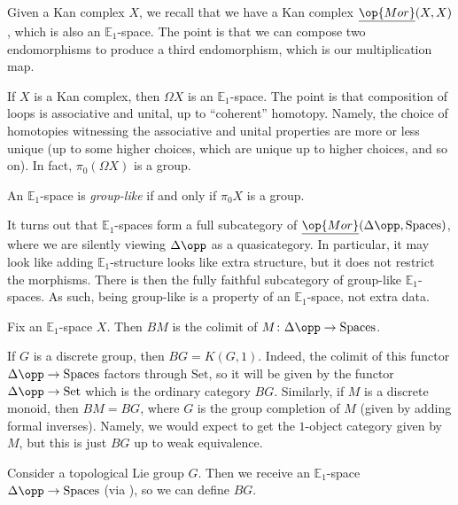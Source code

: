 \documentclass[../notes.tex]{subfiles}
\begin{document}
\begin{example}
	Given a Kan complex $X$, we recall that we have a Kan complex $\underline{\op{Mor}}(X,X)$, which is also an $\mathbb E_1$-space. The point is that we can compose two endomorphisms to produce a third endomorphism, which is our multiplication map.
\end{example}
\begin{example}
	If $X$ is a Kan complex, then $\Omega X$ is an $\mathbb E_1$-space. The point is that composition of loops is associative and unital, up to ``coherent'' homotopy. Namely, the choice of homotopies witnessing the associative and unital properties are more or less unique (up to some higher choices, which are unique up to higher choices, and so on). In fact, $\pi_0(\Omega X)$ is a group.
\end{example}
\begin{definition}
	An $\mathbb E_1$-space is \textit{group-like} if and only if $\pi_0X$ is a group.
\end{definition}
\begin{remark}
	It turns out that $\mathbb E_1$-spaces form a full subcategory of $\underline{\op{Mor}}(\Delta\opp,\mathrm{Spaces})$, where we are silently viewing $\Delta\opp$ as a quasicategory. In particular, it may look like adding $\mathbb E_1$-structure looks like extra structure, but it does not restrict the morphisms. There is then the fully faithful subcategory of group-like $\mathbb E_1$-spaces. As such, being group-like is a property of an $\mathbb E_1$-space, not extra data.
\end{remark}
\begin{definition}
	Fix an $\mathbb E_1$-space $X$. Then $BM$ is the colimit of $M\colon\Delta\opp\to\mathrm{Spaces}$.
\end{definition}
\begin{example}
	If $G$ is a discrete group, then $BG=K(G,1)$. Indeed, the colimit of this functor $\Delta\opp\to\mathrm{Spaces}$ factors through $\mathrm{Set}$, so it will be given by the functor $\Delta\opp\to\mathrm{Set}$ which is the ordinary category $BG$. Similarly, if $M$ is a discrete monoid, then $BM=BG$, where $G$ is the group completion of $M$ (given by adding formal inverses). Namely, we would expect to get the $1$-object category given by $M$, but this is just $BG$ up to weak equivalence.
\end{example}
\begin{example}
	Consider a topological Lie group $G$. Then we receive an $\mathbb E_1$-space $\Delta\opp\to\mathrm{Spaces}$ (via ), so we can define $BG$.
\end{example}
\end{document}
